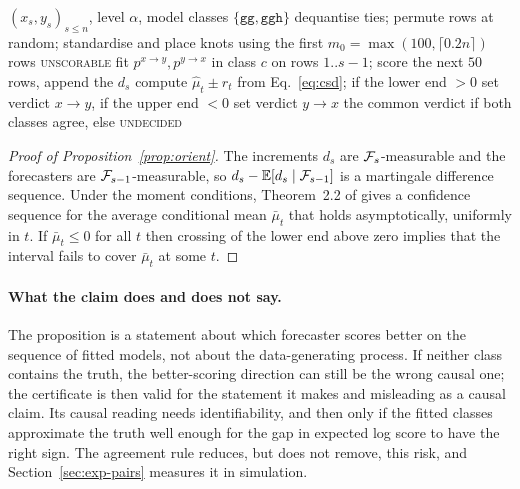 \begin{algorithm}[t]
\caption{Relative-fit orientation of a pair}\label{alg:relfit}
\begin{algorithmic}[1]
\Require $(x_s,y_s)_{s\le n}$, level $\alpha$, model classes $\{\texttt{gg},\texttt{ggh}\}$
\State dequantise ties; permute rows at random; standardise and place knots using the first $m_0=\max(100,\lceil0.2n\rceil)$ rows
 \Return \textsc{unscorable} \EndIf
{}
    \State fit $p^{x\to y},p^{y\to x}$ in class $c$ on rows $1..s-1$; score the next $50$ rows, append the $d_s$
     compute $\hat\mu_t\pm r_t$ from Eq.~\eqref{eq:csd}; if the lower end $>0$ set verdict $x\to y$, if the upper end $<0$ set verdict $y\to x$ \EndIf
  \EndFor
\EndFor
\State \Return the common verdict if both classes agree, else \textsc{undecided}
\end{algorithmic}
\end{algorithm}

\begin{proof}[Proof of Proposition~\ref{prop:orient}]
The increments $d_s$ are $\mathcal{F}_s$-measurable and the forecasters are
$\mathcal{F}_{s-1}$-measurable, so $d_s-\mathbb{E}[d_s\mid\mathcal{F}_{s-1}]$ is a martingale
difference sequence. Under the moment conditions, Theorem~2.2 of
\citet{waudbysmith2024asymptotic} gives a confidence sequence for the average
conditional mean $\bar\mu_t$ that holds asymptotically, uniformly in $t$. If
$\bar\mu_t\le0$ for all $t$ then crossing of the lower end above zero implies
that the interval fails to cover $\bar\mu_t$ at some $t$.
\end{proof}

\paragraph{What the claim does and does not say.} The proposition is a
statement about which forecaster scores better on the sequence of fitted models,
not about the data-generating process. If neither class contains the truth, the
better-scoring direction can still be the wrong causal one; the certificate is
then valid for the statement it makes and misleading as a causal claim. Its
causal reading needs identifiability, and then only if the fitted classes
approximate the truth well enough for the gap in expected log score to have the
right sign. The agreement rule reduces, but does not remove, this risk, and
Section~\ref{sec:exp-pairs} measures it in simulation.

